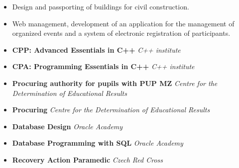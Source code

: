\documentclass[10pt,a4paper,ragged2e]{altacv}
\begin{document}
\divider

\begin{itemize}
\item Design and passporting of buildings for civil construction.
\end{itemize}

\divider

\begin{itemize}
\item Web management, development of an application for the management of organized events and a system of electronic registration of participants.
\end{itemize}


\smallskip
\begin{itemize}
\smallskip
\item \textbf{CPP: Advanced Essentials in C++} \textit{C++ institute}
\smallskip
\item \textbf{CPA: Programming Essentials in C++} \textit{C++ institute}
\smallskip
\item \textbf{Procuring authority for pupils with PUP MZ} \textit{Centre for the Determination of Educational Results}
\smallskip
\item \textbf{Procuring} \textit{Centre for the Determination of Educational Results}
\smallskip
\item \textbf{Database Design} \textit{Oracle Academy}
\smallskip
\item \textbf{Database Programming with SQL} \textit{Oracle Academy}
\smallskip
\item \textbf{Recovery Action Paramedic} \textit{Czech Red Cross}
\end{itemize}




\clearpage


\nocite{*}






\end{document}
